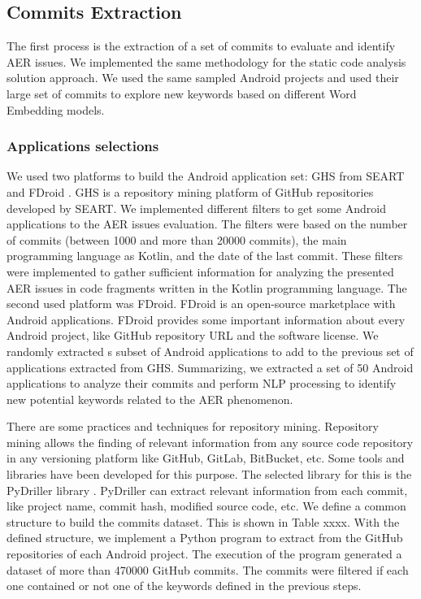 \subsection{Commits Extraction}
The first process is the extraction of a set of commits to evaluate and identify AER issues. We implemented the same methodology for the static code analysis solution approach. We used the same sampled Android projects and used their large set of commits to explore new keywords based on different Word Embedding models.

\subsubsection{Applications selections}
We used two platforms to build the Android application set: GHS from SEART and FDroid \cite{seart,fdroid}. GHS is a repository mining platform of GitHub repositories developed by SEART. We implemented different filters to get some Android applications to the AER issues evaluation. The filters were based on the number of commits (between 1000 and more than 20000 commits), the main programming language as Kotlin, and the date of the last commit. These filters were implemented to gather sufficient information for analyzing the presented AER issues in code fragments written in the Kotlin programming language.
The second used platform was FDroid. FDroid is an open-source marketplace with Android applications. FDroid provides some important information about every Android project, like GitHub repository URL and the software license. We randomly extracted s subset of Android applications to add to the previous set of applications extracted from GHS. Summarizing, we extracted a set of 50 Android applications to analyze their commits and perform NLP processing to identify new potential keywords related to the AER phenomenon.

There are some practices and techniques for repository mining. Repository mining allows the finding of relevant information from any source code repository in any versioning platform like GitHub, GitLab, BitBucket, etc. Some tools and libraries have been developed for this purpose. The selected library for this is the PyDriller library \cite{pydriller}.  PyDriller can extract relevant information from each commit, like project name, commit hash, modified source code, etc. We define a common structure to build the commits dataset. This is shown in Table xxxx.  With the defined structure, we implement a Python program to extract from the GitHub repositories of each Android project. The execution of the program generated a dataset of more than 470000 GitHub commits. The commits were filtered if each one contained or not one of the keywords defined in the previous steps.

